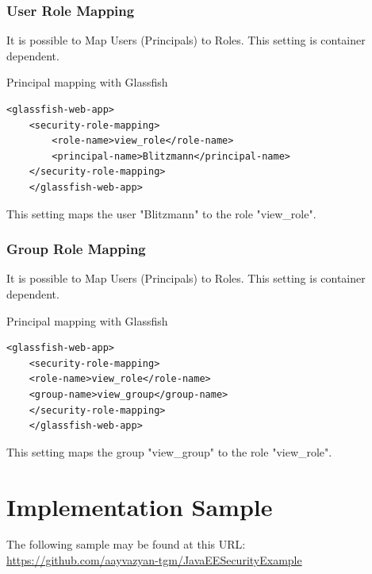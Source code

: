 \documentclass[12pt,a4paper]{report}
\begin{document}
\subsection{User Role Mapping}
It is possible to Map Users (Principals) to Roles. This setting is container dependent.\\
\begin{bclogo}[couleur=yellow!15,arrondi=0.1,logo=\bccrayon, ombre = true]{Principal mapping with Glassfish}
	\begin{lstlisting}[style=XML]
	<glassfish-web-app>
	<security-role-mapping>
		<role-name>view_role</role-name>
		<principal-name>Blitzmann</principal-name>
	</security-role-mapping>
	</glassfish-web-app>
	\end{lstlisting}
\end{bclogo}
This setting maps the user "Blitzmann" to the role "view\_role".

\subsection{Group Role Mapping}
It is possible to Map Users (Principals) to Roles. This setting is container dependent.\\
\begin{bclogo}[couleur=yellow!15,arrondi=0.1,logo=\bccrayon, ombre = true]{Principal mapping with Glassfish}
	\begin{lstlisting}[style=XML]
	<glassfish-web-app>
	<security-role-mapping>
	<role-name>view_role</role-name>
	<group-name>view_group</group-name>
	</security-role-mapping>
	</glassfish-web-app>
	\end{lstlisting}
\end{bclogo}
This setting maps the group "view\_group" to the role "view\_role".

\chapter{Implementation Sample}
The following sample may be found at this URL:\\
\href{https://github.com/aayvazyan-tgm/JavaEESecurityExample}{https://github.com/aayvazyan-tgm/JavaEESecurityExample}\\
\end{document}
